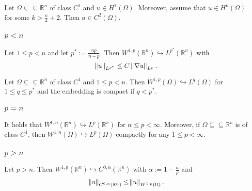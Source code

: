 \begin{corollary}
	Let $\Omega \subseteq \subseteq \mathbb{R}^n$ of class $C^1$ and $u \in H^1(\Omega)$. Moreover, assume that $u \in H^k(\Omega)$ for some $k > \frac{n}{2} + 2$. Then $u \in C^2(\Omega)$.
\end{corollary}

\subsubsection*{$p < n$}

\begin{theorem}
	Let $1 \leq p < n$ and let $p^* := \frac{np}{n - p}$. Then $W^{1,p}(\mathbb{R}^n) \hookrightarrow L^{p^*}(\mathbb{R}^n)$ with
	\begin{equation*}
		\norm{u}_{L^{p^*}} \leq C \norm[0]{\nabla u}_{L^p}.
	\end{equation*}
\end{theorem}

\begin{theorem}
	Let $\Omega \subseteq \subseteq \mathbb{R}^n$ of class $C^1$ and $1 \leq p < n$. Then $W^{1,p}(\Omega) \hookrightarrow L^q(\Omega)$ for $1 \leq q \leq p^*$ and the embedding is compact if $q < p^*$.
\end{theorem}

\subsubsection*{$p = n$}

\begin{theorem}
	It holds that $W^{1,n}(\mathbb{R}^n) \hookrightarrow L^p(\mathbb{R}^n)$ for $n \leq p < \infty$. Moreover, if $\Omega \subseteq \subseteq \mathbb{R}^n$ is of class $C^1$, then $W^{1,n}(\Omega) \hookrightarrow L^p(\Omega)$ compactly for any $1 \leq p < \infty$.
\end{theorem}

\subsubsection*{$p > n$}

\begin{theorem}
	Let $p > n$. Then $W^{1,p}(\mathbb{R}^n) \hookrightarrow C^{0,\alpha}(\mathbb{R}^n)$ with $\alpha := 1 - \frac{n}{p}$ and
	\begin{equation*}
		\norm[0]{u}_{C^{0,\alpha}(\mathbb{R}^n)} \leq \norm{u}_{W^{1,p}(\Omega)}.
	\end{equation*}
\end{theorem}

